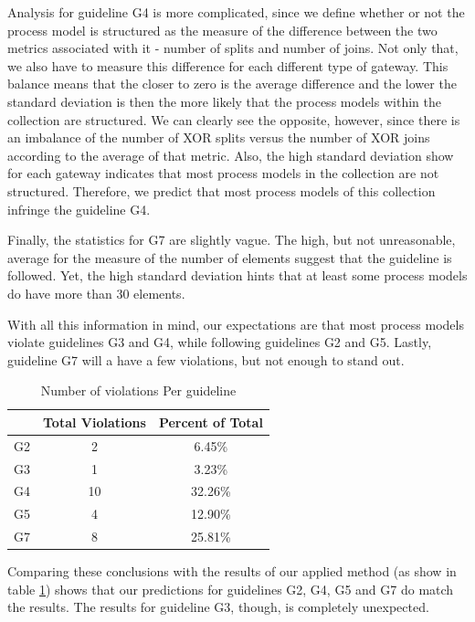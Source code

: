 \documentclass[a4paper,twoside]{article}
\begin{document}
Analysis for guideline G4 is more complicated, since we define whether or not the process model is structured as the measure of the difference between the two metrics associated with it - number of splits and number of joins. Not only that, we also have to measure this difference for each different type of gateway. This balance means that the closer to zero is the average difference and the lower the standard deviation is then the more likely that the process models within the collection are structured.  We can clearly see the opposite, however, since there is an imbalance of the number of XOR splits versus the number of XOR joins according to the average of that metric. Also, the high standard deviation show for each gateway indicates that most process models in the collection are not structured. Therefore, we predict that most process models of this collection infringe the guideline G4.

Finally, the statistics for G7 are slightly vague. The high, but not unreasonable, average for the measure of the number of elements suggest that the guideline is followed. Yet, the high standard deviation hints that at least some process models do have more than 30 elements.

With all this information in mind, our expectations are that most process models violate guidelines G3 and G4, while following guidelines G2 and G5. Lastly, guideline G7 will a have a few violations, but not enough to stand out.

\begin{table}[]
	\centering
	\caption{Number of violations Per guideline}
	\label{ViolationsPerGuideline}
	\begin{tabular}{|c|c|c|}
		\hline
		& Total Violations & Percent of Total \\ \hline
		G2 & 2 & 6.45\% \\ \hline
		G3 & 1 & 3.23\% \\ \hline
		G4 & 10 & 32.26\% \\ \hline %
		G5 & 4 & 12.90\% \\ \hline
		G7 & 8 & 25.81\% \\ \hline
	\end{tabular}
\end{table}

Comparing these conclusions with the results of our applied method (as show in table \ref{ViolationsPerGuideline}) shows that our predictions for guidelines G2, G4, G5 and G7 do match the results. The results for guideline G3, though, is completely unexpected. 
\end{document}
